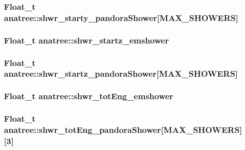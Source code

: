 \hypertarget{classanatree_aa65384df0a529cfa840a1fb79211983c}{
\subsubsection[{shwr\-\_\-starty\-\_\-pandora\-Shower}]{\setlength{\rightskip}{0pt plus 5cm}Float\-\_\-t anatree\-::shwr\-\_\-starty\-\_\-pandora\-Shower\mbox{[}{\bf M\-A\-X\-\_\-\-S\-H\-O\-W\-E\-R\-S}\mbox{]}}}\label{classanatree_aa65384df0a529cfa840a1fb79211983c}
\hypertarget{classanatree_a0f1f0fe9cceeb189a3366ca4afbb6f9f}{
\subsubsection[{shwr\-\_\-startz\-\_\-emshower}]{\setlength{\rightskip}{0pt plus 5cm}Float\-\_\-t anatree\-::shwr\-\_\-startz\-\_\-emshower}}\label{classanatree_a0f1f0fe9cceeb189a3366ca4afbb6f9f}
\hypertarget{classanatree_abef515b0658219775cdd05053b343bff}{
\subsubsection[{shwr\-\_\-startz\-\_\-pandora\-Shower}]{\setlength{\rightskip}{0pt plus 5cm}Float\-\_\-t anatree\-::shwr\-\_\-startz\-\_\-pandora\-Shower\mbox{[}{\bf M\-A\-X\-\_\-\-S\-H\-O\-W\-E\-R\-S}\mbox{]}}}\label{classanatree_abef515b0658219775cdd05053b343bff}
\hypertarget{classanatree_a284ba0af819815e92479c6c97377924b}{
\subsubsection[{shwr\-\_\-tot\-Eng\-\_\-emshower}]{\setlength{\rightskip}{0pt plus 5cm}Float\-\_\-t anatree\-::shwr\-\_\-tot\-Eng\-\_\-emshower}}\label{classanatree_a284ba0af819815e92479c6c97377924b}
\hypertarget{classanatree_a772288aae2df1fc9162a8f82db33c5d3}{
\subsubsection[{shwr\-\_\-tot\-Eng\-\_\-pandora\-Shower}]{\setlength{\rightskip}{0pt plus 5cm}Float\-\_\-t anatree\-::shwr\-\_\-tot\-Eng\-\_\-pandora\-Shower\mbox{[}{\bf M\-A\-X\-\_\-\-S\-H\-O\-W\-E\-R\-S}\mbox{]}\mbox{[}3\mbox{]}}}\label{classanatree_a772288aae2df1fc9162a8f82db33c5d3}
